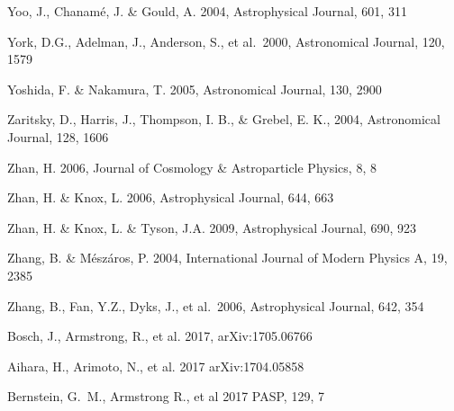 \documentclass{emulateapj}
\begin{document}
\begin{thebibliography}{}
\bibitem[()]{} Yoo, J., Chanam\'{e}, J. \& Gould, A. 2004, Astrophysical Journal, 601, 311

\bibitem[()]{} York, D.G., Adelman, J., Anderson, S., et al.~2000, Astronomical Journal, 120, 1579

\bibitem[()]{} Yoshida, F. \& Nakamura, T. 2005, Astronomical Journal, 130, 2900

\bibitem[()]{} Zaritsky, D., Harris, J., Thompson, I. B., \& Grebel, E. K., 2004, Astronomical Journal, 128, 1606

\bibitem[()]{} Zhan, H. 2006, Journal of Cosmology \& Astroparticle Physics, 8, 8

\bibitem[()]{} Zhan, H. \& Knox, L. 2006,  Astrophysical Journal, 644, 663

\bibitem[()]{} Zhan, H. \& Knox, L. \& Tyson, J.A. 2009,  Astrophysical Journal, 690, 923

\bibitem[()]{} Zhang, B. \& M\'{e}sz\'{a}ros, P. 2004, International Journal of Modern Physics A, 19, 2385

\bibitem[()]{} Zhang, B., Fan, Y.Z., Dyks, J., et al.~2006,  Astrophysical Journal, 642, 354

 Bosch, J., Armstrong, R., et al. 2017, arXiv:1705.06766

 Aihara, H., Arimoto, N., et al. 2017 arXiv:1704.05858

 Bernstein, G.~M., Armstrong R., et al 2017 PASP, 129, 7
  
\end{thebibliography}
\end{document}
